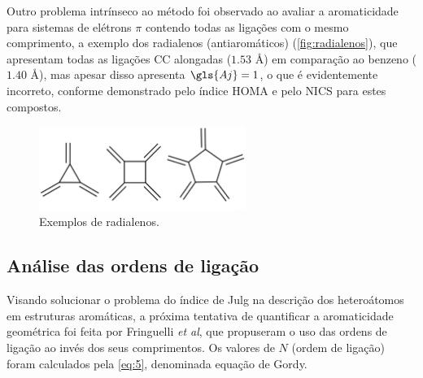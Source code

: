 Outro problema intrínseco ao método foi observado ao avaliar a aromaticidade para sistemas de elétrons $\pi$ contendo todas as ligações com o mesmo comprimento, a exemplo dos radialenos (antiaromáticos) (\autoref{fig:radialenos}), que apresentam todas as ligações CC alongadas ($1.53$ \AA) em comparação ao benzeno ($1.40$ \AA), mas apesar disso apresenta $\gls{Aj} = 1$, o que é evidentemente incorreto, conforme demonstrado pelo índice \gls{HOMA} e pelo \gls{NICS} para estes compostos.

\begin{figure}[htb]
	\caption{\label{fig:radialenos} Exemplos de radialenos.}
	\begin{center}
		\includegraphics[width=0.60\textwidth]{images/Screenshot from 2022-07-13 13-24-27.png}
	\end{center}
\end{figure}

\subsection{Análise das ordens de ligação}

Visando solucionar o problema do índice de Julg na descrição dos heteroátomos em estruturas aromáticas, a próxima tentativa de quantificar a aromaticidade geométrica foi feita por Fringuelli \textit{et al}\autocite{Fringuelli1974}, que propuseram o uso das ordens de ligação ao invés dos seus comprimentos. Os valores de $N$ (ordem de ligação) foram calculados pela \autoref{eq:5}, denominada equação de Gordy\autocite{Gordy1947}.

\newpage

